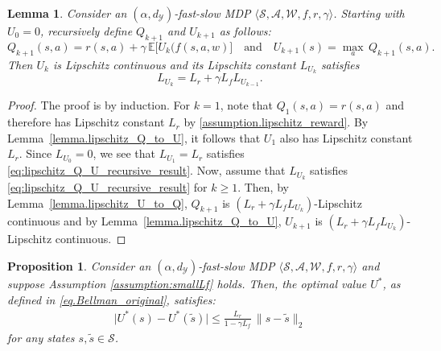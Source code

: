 \documentclass[11pt, notitlepage]{article}
\newcommand{\E}{\mathbb{E}}
\newcommand{\1}{\mathbbm{1}}
\newtheorem{lemma}{Lemma}[section]
\newtheorem{proposition}{Proposition}[section]
\begin{document}
\begin{lemma} \label{lemma.lipschitz_Q_U_recursive}
Consider an $(\alpha, d_\mathcal{Y})$-fast-slow MDP $\langle \mathcal{S}, \mathcal{A}, \mathcal{W}, f, r, \gamma \rangle$. Starting with $U_0=0$, recursively define $Q_{k+1}$ and $U_{k+1}$ as follows:
    \begin{equation*}
        Q_{k+1}(s,a) = r(s,a) + \gamma \,\E\bigl[U_k(f(s,a,w)\bigr] \quad \text{and} \quad U_{k+1}(s) = \max_a \, Q_{k+1}(s,a).
    \end{equation*}
    Then $U_k$ is Lipschitz continuous and its Lipschitz constant $L_{U_k}$ satisfies
    \begin{equation}
        L_{U_k} = L_r + \gamma L_f L_{U_{k-1}}.
        \label{eq:lipschitz_Q_U_recursive_result}
    \end{equation}
\end{lemma}

\begin{proof}
    The proof is by induction. For $k=1$, note that $Q_1(s,a) = r(s,a)$ and therefore has Lipschitz constant $L_r$
    by \eqref{assumption.lipschitz_reward}. By Lemma~\ref{lemma.lipschitz_Q_to_U}, it follows that $U_1$ also has Lipschitz constant $L_r$. Since $L_{U_0} = 0$, we see that $L_{U_1} = L_r$ satisfies \eqref{eq:lipschitz_Q_U_recursive_result}.
    Now, assume that $L_{U_k}$ satisfies \eqref{eq:lipschitz_Q_U_recursive_result} for $k \ge 1$.
    Then, by Lemma~\ref{lemma.lipschitz_U_to_Q}, $Q_{k+1}$ is $(L_r + \gamma L_f L_{U_{k}})$-Lipschitz continuous and by Lemma~\ref{lemma.lipschitz_Q_to_U}, $U_{k+1}$ is $(L_r + \gamma L_f L_{U_{k}})$-Lipschitz continuous.
\end{proof}





\begin{proposition} \label{prop.lipschitz_value}
    Consider an $(\alpha, d_\mathcal{Y})$-fast-slow MDP $\langle \mathcal{S}, \mathcal{A}, \mathcal{W}, f, r, \gamma \rangle$ and suppose Assumption \ref{assumption:smallLf} holds. Then, the optimal value $U^*$, as defined in \eqref{eq.Bellman_original}, satisfies:
    \begin{align*}
        \bigl |U^*(s) - U^*(\tilde{s}) \bigr| 
        \leq \frac{L_r}{1 - \gamma L_f} \, \bigl\|s-\tilde{s}\bigr\|_2
    \end{align*}
    for any states $s, \tilde{s} \in \mathcal S$.
\end{proposition}
\end{document}
